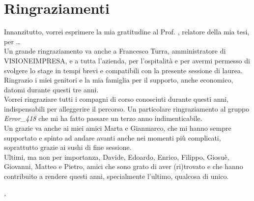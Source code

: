 \cleardoublepage
{}
{}

\bigskip

\begingroup
\let\clearpage\relax
\let\cleardoublepage\relax
\let\cleardoublepage\relax

\chapter*{Ringraziamenti}

Innanzitutto, vorrei esprimere la mia gratitudine al Prof. \myProf, relatore della mia tesi, per \dots \\

\noindent Un grande ringraziamento va anche a Francesco Turra, amministratore di VISIONEIMPRESA, e a tutta l'azienda, per l'ospitalità e per avermi permesso di svolgere lo stage in tempi brevi e compatibili con la presente sessione di laurea.\\

\noindent Ringrazio i miei genitori e la mia famiglia per il supporto, anche economico, datomi durante questi tre anni.\\

\noindent Vorrei ringraziare tutti i compagni di corso conosciuti durante questi anni, indispensabili per alleggerire il percorso. Un particolare ringraziamento al gruppo \textit{Error\_418} che mi ha fatto passare un terzo anno indimenticabile.\\

\noindent Un grazie va anche ai miei amici Marta e Gianmarco, che mi hanno sempre supportato e spinto ad andare avanti anche nei momenti più complicati, soprattutto grazie ai sushi di fine sessione.\\

\noindent Ultimi, ma non per importanza, Davide, Edoardo, Enrico, Filippo, Giosuè, Giovanni, Matteo e Pietro, amici che sono grato di aver (ri)trovato e che hanno contribuito a rendere questi anni, specialmente l'ultimo, qualcosa di unico.

\bigskip

\noindent\textit{\myLocation, \myTime}
\hfill \myName

\endgroup
